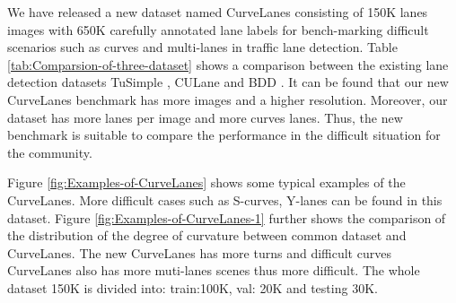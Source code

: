 \documentclass[runningheads]{llncs}
\begin{document}
We have released a new dataset named CurveLanes consisting of 150K
lanes images with 650K carefully annotated lane labels for bench-marking
difficult scenarios such as curves and multi-lanes in traffic lane
detection. Table \ref{tab:Comparsion-of-three-dataset} shows a comparison
between the existing lane detection datasets TuSimple \cite{TuSimple},
CULane \cite{pan2018spatial} and BDD \cite{yu2018bdd100k}. It can
be found that our new CurveLanes benchmark has more images and a higher
resolution. Moreover, our dataset has more lanes per image and more
curves lanes. Thus, the new benchmark is suitable to compare the performance
in the difficult situation for the community.

Figure \ref{fig:Examples-of-CurveLanes} shows some typical examples
of the CurveLanes. More difficult cases such as S-curves, Y-lanes
can be found in this dataset. Figure \ref{fig:Examples-of-CurveLanes-1}
further shows the comparison of the distribution of the degree of
curvature between common dataset and CurveLanes. The new CurveLanes has 
more turns and difficult curves CurveLanes
also has more muti-lanes scenes thus more difficult. The whole dataset
150K is divided into: train:100K, val: 20K and testing
30K.
\end{document}
